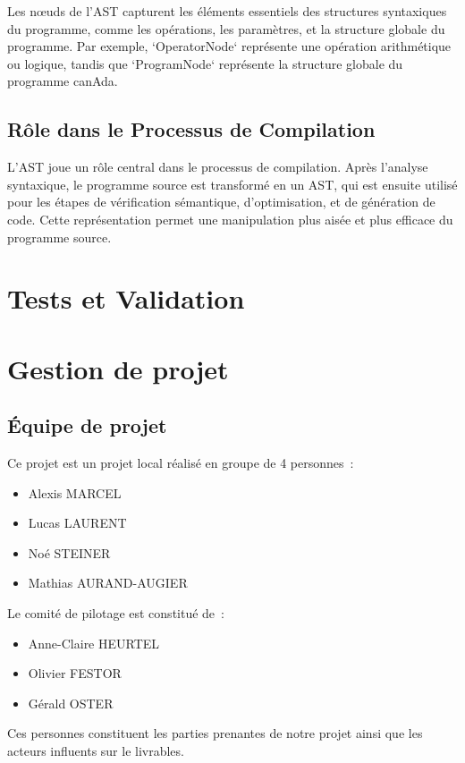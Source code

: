 \documentclass[french,a4paper]{article}
\begin{document}
    Les nœuds de l'AST capturent les éléments essentiels des structures syntaxiques du programme, comme les opérations, les paramètres, et la structure globale du programme. Par exemple, `OperatorNode` représente une opération arithmétique ou logique, tandis que `ProgramNode` représente la structure globale du programme canAda.

    \subsection{Rôle dans le Processus de Compilation}

    L'AST joue un rôle central dans le processus de compilation. Après l'analyse syntaxique, le programme source est transformé en un AST, qui est ensuite utilisé pour les étapes de vérification sémantique, d'optimisation, et de génération de code. Cette représentation permet une manipulation plus aisée et plus efficace du programme source.

    \section{Tests et Validation}

    \section{Gestion de projet}
    \subsection{Équipe de projet}
    Ce projet est un projet local réalisé en groupe de 4 personnes~:
    \begin{itemize}
        \item Alexis MARCEL
        \item Lucas LAURENT
        \item Noé STEINER
        \item Mathias AURAND-AUGIER
    \end{itemize}
    Le comité de pilotage est constitué de~:
    \begin{itemize}
        \item Anne-Claire HEURTEL
        \item Olivier FESTOR
        \item Gérald OSTER
    \end{itemize}
    Ces personnes constituent les parties prenantes de notre projet ainsi que les acteurs influents sur le livrables.
\end{document}
